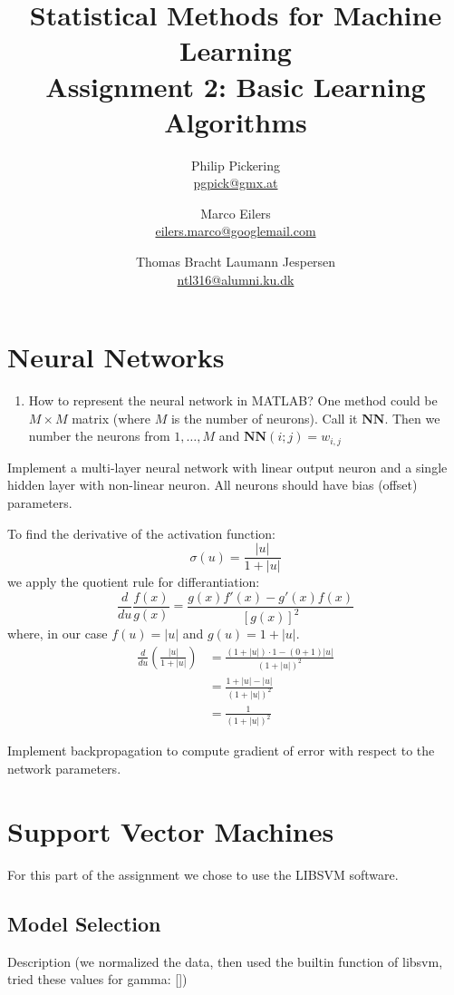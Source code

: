 \documentclass{article}
\author{Philip Pickering\\ \url{pgpick@gmx.at} \and Marco Eilers\\ \url{eilers.marco@googlemail.com} \and Thomas Bracht Laumann Jespersen\\ \url{ntl316@alumni.ku.dk}}
\title{Statistical Methods for Machine Learning\\ Assignment 2: Basic Learning Algorithms}
\date{}
\newcommand{\vect}[1]{\ensuremath{\boldsymbol{\mathbf{#1}}}\xspace}
\begin{document}
\maketitle

\section{Neural Networks}

\begin{enumerate}\setlength{\itemsep}{-3pt}
  \item How to represent the neural network in MATLAB? One method
    could be $M\times M$ matrix (where $M$ is the number of
    neurons). Call it \vect{NN}. Then we number the neurons from
    $1,\dots,M$ and $\vect{NN}(i;j) = w_{i,j}$
\end{enumerate}

Implement a multi-layer neural network with linear output neuron and a
single hidden layer with non-linear neuron. All neurons should have
bias (offset) parameters.

To find the derivative of the activation function:
\[
\sigma(u) = \frac{|u|}{1 + |u|}
\]
we apply the quotient rule for differantiation:
\[
\frac{d}{du}\frac{f(x)}{g(x)} = \frac{g(x)f'(x) - g'(x)f(x)}{\left[g(x)\right]^2}
\]
where, in our case $f(u) = |u|$ and $g(u) = 1 + |u|$.
\begin{align}
  \frac{d}{du}\left(\frac{|u|}{1 + |u|}\right) &= \frac{(1 + |u|)\cdot 1 - (0 + 1)|u|}{(1 + |u|)^2}\\
  &= \frac{1 + |u| - |u|}{(1 + |u|)^2}\\
  &= \frac{1}{(1 + |u|)^2}
\end{align}

Implement backpropagation to compute gradient of error with respect to
the network parameters.

\section{Support Vector Machines}

For this part of the assignment we chose to use the LIBSVM software.

\subsection{Model Selection}
Description (we normalized the data, then used the builtin function of libsvm, tried these values for gamma: [])
\end{document}
